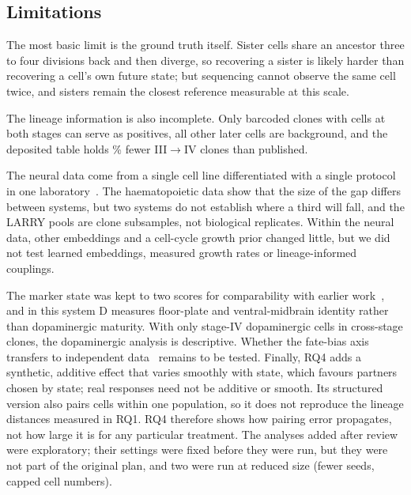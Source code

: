 \documentclass[10pt,journal,compsoc]{IEEEtran}
\begin{document}
\subsection{Limitations}\label{sec:limitations}
The most basic limit is the ground truth itself. Sister cells share an ancestor three to
four divisions back and then diverge, so recovering a sister is likely harder than
recovering a cell's own future state; but sequencing cannot observe the same cell twice,
and sisters remain the closest reference measurable at this scale.

The lineage information is also incomplete. Only barcoded clones with cells at both stages
can serve as positives, all other later cells are background, and the deposited table
holds \pctExpThreeCloneGap\% fewer III$\to$IV clones than published.

The neural data come from a single cell line differentiated with a single protocol in one
laboratory~\cite{You_2023}. The haematopoietic data show that the size of the gap differs
between systems, but two systems do not establish where a third will fall, and the LARRY
pools are clone subsamples, not biological replicates. Within the neural data, other
embeddings and a cell-cycle growth prior changed little, but we did not test learned
embeddings, measured growth rates or lineage-informed couplings.

The marker state was kept to two scores for comparability with earlier
work~\cite{Kanu_TCBB}, and in this system D measures floor-plate and ventral-midbrain
identity rather than dopaminergic maturity. With only \nDACellsCrossStage{} stage-IV
dopaminergic cells in cross-stage clones, the dopaminergic analysis is descriptive. Whether
the fate-bias axis transfers to independent data~\cite{Jerber_2021} remains to be tested.
Finally, RQ4 adds a synthetic, additive effect that varies smoothly with state, which
favours partners chosen by state; real responses need not be additive or smooth. Its
structured version also pairs cells within one population, so it does not reproduce the
lineage distances measured in RQ1. RQ4 therefore shows how pairing error propagates, not
how large it is for any particular treatment. The analyses added after review were
exploratory; their settings were fixed before they were run, but they were not part of the
original plan, and two were run at reduced size (fewer seeds, capped cell numbers).

\end{document}
